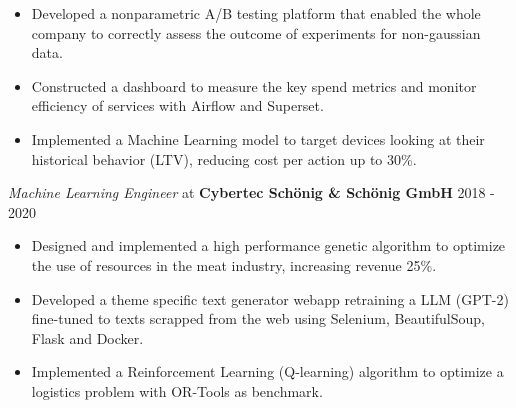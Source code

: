 \documentclass[margin]{res}
\begin{document}
\begin{resume}
\begin{itemize}
        \item Developed a nonparametric A/B testing platform that enabled the whole company to 
            correctly assess the outcome of experiments for non-gaussian data. 
        \item Constructed a dashboard to measure the key spend metrics and monitor
            efficiency of services with Airflow and Superset.
        \item Implemented a Machine Learning model to target devices looking at their
            historical behavior (LTV), reducing cost per action up to 30\%.
    \end{itemize}
    {\sl Machine Learning Engineer} at {\bf Cybertec Sch\"onig \& Sch\"onig GmbH} \hfill 2018 - 2020
    \begin{itemize}  \itemsep -2pt %
        \item Designed and implemented a high performance genetic 
            algorithm to optimize the use of resources in the meat industry, increasing revenue 25\%.
         \item Developed a theme specific text generator webapp retraining a LLM (GPT-2) fine-tuned to 
             texts scrapped from the web using Selenium, BeautifulSoup, Flask and Docker.
        \item Implemented a Reinforcement Learning (Q-learning) algorithm 
            to optimize a logistics problem with OR-Tools as benchmark.
    \end{itemize}
		


\end{resume}
\end{document}
